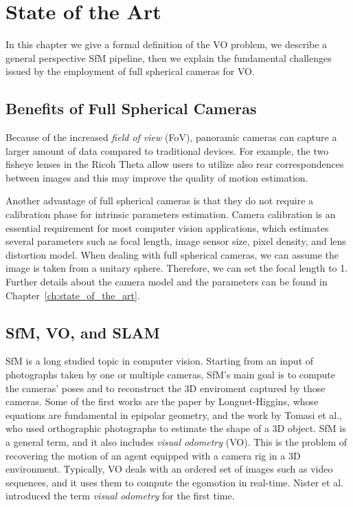 \chapter{State of the Art}
\label{ch:state_of_the_art}
In this chapter we give a formal definition of the VO problem, we describe a 
general perspective SfM pipeline, then 
we explain the fundamental challenges issued by the employment of full 
spherical cameras for VO.
%
%
\section{Benefits of Full Spherical Cameras}
Because of the increased \textit{field of view} (FoV), panoramic cameras can capture a larger amount of data compared to traditional devices. For example, the two fisheye lenses in the Ricoh Theta allow users to utilize also rear correspondences between images and this may improve the quality of motion estimation.

Another advantage of full spherical cameras is that they do not require a calibration phase for intrinsic parameters estimation. Camera calibration is an essential requirement for most computer vision applications, which estimates several parameters such as focal length, image 
sensor size, pixel density, and lens distortion model. When dealing with full spherical cameras, we can assume the image is taken from a unitary sphere. Therefore, we can set the focal length to 1. Further details about the camera model and the parameters can be found in Chapter~\ref{ch:state_of_the_art}.

\section{SfM, VO, and SLAM}
SfM is a long studied topic in computer vision. Starting from an input of photographs taken by one or multiple cameras, SfM's main goal is to compute the cameras' poses and to reconstruct the 3D enviroment captured by those cameras.
%
Some of the first works are the paper by Longuet-Higgins\cite{longuet1981computer}, whose equations are fundamental in epipolar geometry, and the work by Tomasi et al.\cite{tomasi1992shape}, who used orthographic photographs to estimate the shape of a 3D object.
%
SfM is a general term, and it also includes \textit{visual odometry} (VO). This is the problem of recovering the motion of an agent equipped with a camera rig in a 3D environment. Typically, VO deals with an ordered set of images such as video sequences, and it uses them to compute the egomotion in real-time. Nister et al.\cite{nister2004visual} introduced the term \textit{visual odometry} for the first time.

